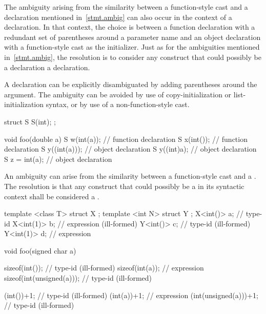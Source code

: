 \pnum
The ambiguity arising from the similarity between a function-style cast and
a declaration mentioned in~\ref{stmt.ambig} can also occur in the context of a declaration.
In that context, the choice is between a function declaration with
a redundant set of parentheses around a parameter name and an object declaration
with a function-style cast as the initializer.
Just as for the ambiguities mentioned in~\ref{stmt.ambig},
the resolution is to consider any construct that could possibly
be a declaration a declaration.
\begin{note}
A declaration can be explicitly disambiguated by adding parentheses
around the argument.
The ambiguity can be avoided by use of copy-initialization or
list-initialization syntax, or by use of a non-function-style cast.
\end{note}
\begin{example}
\begin{codeblock}
struct S {
  S(int);
};

void foo(double a) {
  S w(int(a));                  // function declaration
  S x(int());                   // function declaration
  S y((int(a)));                // object declaration
  S y((int)a);                  // object declaration
  S z = int(a);                 // object declaration
}
\end{codeblock}
\end{example}

\pnum
An ambiguity can arise from the similarity between a function-style
cast and a
.
The resolution is that any construct that could possibly be a
in its syntactic context shall be considered a
.
\begin{example}
\begin{codeblock}
template <class T> struct X {};
template <int N> struct Y {};
X<int()> a;                     // type-id
X<int(1)> b;                    // expression (ill-formed)
Y<int()> c;                     // type-id (ill-formed)
Y<int(1)> d;                    // expression

void foo(signed char a) {
  sizeof(int());                // type-id (ill-formed)
  sizeof(int(a));               // expression
  sizeof(int(unsigned(a)));     // type-id (ill-formed)

  (int())+1;                    // type-id (ill-formed)
  (int(a))+1;                   // expression
  (int(unsigned(a)))+1;         // type-id (ill-formed)
}
\end{codeblock}
\end{example}

